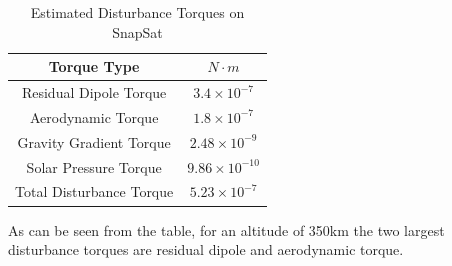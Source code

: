 \begin{table}[H]
    \begin{center}
        \caption{Estimated Disturbance Torques on SnapSat}
        \begin{tabular}{|c|c|}
            \hline
            Torque Type & $N \cdot m$ \\
            \hline
            Residual Dipole Torque & $3.4 \times 10^{-7}$ \\
            \hline
            Aerodynamic Torque & $1.8 \times 10^{-7}$ \\
            \hline
            Gravity Gradient Torque & $2.48 \times 10^{-9}$ \\
            \hline
            Solar Pressure Torque & $9.86 \times 10^{-10}$ \\
            \hline
            Total Disturbance Torque & $5.23 \times 10^{-7}$ \\
            \hline
        \end{tabular}
    \end{center}
    \vspace{-6mm}
\end{table}
\noindent
As can be seen from the table, for an altitude of 350km the two largest disturbance torques are residual dipole and aerodynamic torque.